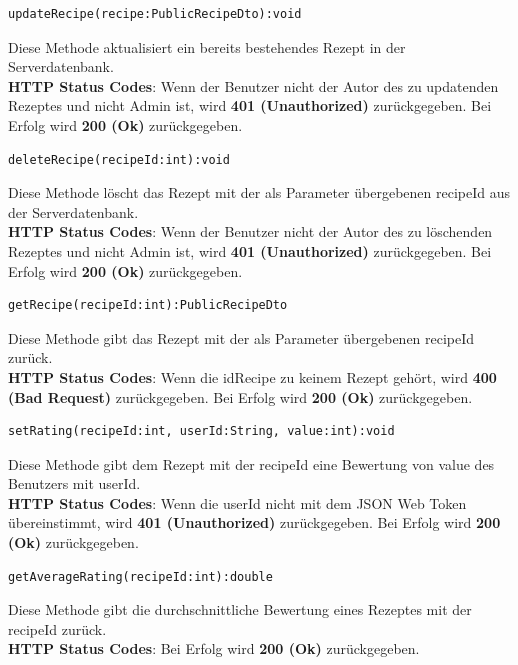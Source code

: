 \begin{lstlisting}
updateRecipe(recipe:PublicRecipeDto):void
\end{lstlisting}
Diese Methode aktualisiert ein bereits bestehendes Rezept in der Serverdatenbank.\\
\textbf{HTTP Status Codes}:
Wenn der Benutzer nicht der Autor des zu updatenden Rezeptes und nicht Admin ist, wird \textbf{401 (Unauthorized)} zurückgegeben. Bei Erfolg wird \textbf{200 (Ok)} zurückgegeben.
\vspace{1cm}  

 \begin{lstlisting}
deleteRecipe(recipeId:int):void
\end{lstlisting}
Diese Methode löscht das Rezept mit der als Parameter übergebenen recipeId aus der Serverdatenbank.\\
\textbf{HTTP Status Codes}:
Wenn der Benutzer nicht der Autor des zu löschenden Rezeptes und nicht Admin ist, wird \textbf{401 (Unauthorized)} zurückgegeben. Bei Erfolg wird \textbf{200 (Ok)} zurückgegeben.
\vspace{1cm}

 \begin{lstlisting}
getRecipe(recipeId:int):PublicRecipeDto
\end{lstlisting}
Diese Methode gibt das Rezept mit der als Parameter übergebenen recipeId zurück.\\
\textbf{HTTP Status Codes}:
Wenn die idRecipe zu keinem Rezept gehört, wird \textbf{400 (Bad Request)} zurückgegeben. Bei Erfolg wird \textbf{200 (Ok)} zurückgegeben.
\vspace{1cm}

 \begin{lstlisting}
setRating(recipeId:int, userId:String, value:int):void
\end{lstlisting}
Diese Methode gibt dem Rezept mit der recipeId eine Bewertung von value des Benutzers mit userId.\\
\textbf{HTTP Status Codes}:
Wenn die userId nicht mit dem JSON Web Token übereinstimmt, wird \textbf{401 (Unauthorized)} zurückgegeben. Bei Erfolg wird \textbf{200 (Ok)} zurückgegeben.
\vspace{1cm}
  
\begin{lstlisting}
getAverageRating(recipeId:int):double
\end{lstlisting}
Diese Methode gibt die durchschnittliche Bewertung eines Rezeptes mit der recipeId zurück.\\
\textbf{HTTP Status Codes}:
Bei Erfolg wird \textbf{200 (Ok)} zurückgegeben.
\vspace{1cm}

